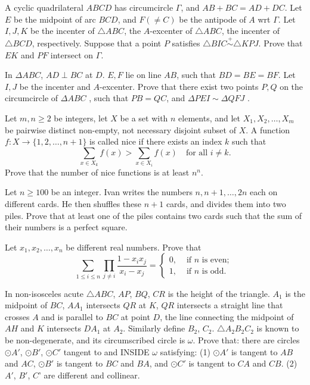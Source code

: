 \documentclass[11pt]{scrartcl}
\begin{document}
\begin{problem}[571352513856417722]
	A cyclic quadrilateral $ABCD$ has circumcircle $\Gamma$, and $AB+BC=AD+DC$. Let $E$ be the midpoint of arc $BCD$, and $F (\neq C)$ be the antipode of $A$ wrt $\Gamma$. Let $I,J,K$ be the incenter of $\triangle ABC$, the $A$-excenter of $\triangle ABC$, the incenter of $\triangle BCD$, respectively.
Suppose that a point $P$ satisfies $\triangle BIC \stackrel{+}{\sim} \triangle KPJ$. Prove that $EK$ and $PF$ intersect on $\Gamma.$
\end{problem}
\begin{problem}[8402748184217471405]
In $\Delta ABC$, $AD \perp BC$ at $D$. $E,F$ lie on line $AB$, such that $BD=BE=BF$. Let $I,J$ be the incenter and $A$-excenter. Prove that there exist two points $P,Q$ on the circumcircle of $\Delta ABC$ , such that $PB=QC$, and $\Delta PEI \sim \Delta QFJ$ .
\end{problem}
\begin{problem}[967014444176640]
Let $m,n \geqslant 2$ be integers, let $X$ be a set with $n$ elements, and let $X_1,X_2,\ldots,X_m$ be pairwise distinct non-empty, not necessary disjoint subset of $X$. A function $f \colon X \to \{1,2,\ldots,n+1\}$ is called nice if there exists an index $k$ such that\[\sum_{x \in X_k} f(x)>\sum_{x \in X_i} f(x) \quad \text{for all } i \ne k.\]Prove that the number of nice functions is at least $n^n$.
\end{problem}
\begin{problem}[258585206260584]
Let $n \geqslant 100$ be an integer. Ivan writes the numbers $n, n+1, \ldots, 2 n$ each on different cards. He then shuffles these $n+1$ cards, and divides them into two piles. Prove that at least one of the piles contains two cards such that the sum of their numbers is a perfect square.
\end{problem}
\begin{problem}[443006607452241]
Let $x_1, x_2, \dots, x_n$ be different real numbers. Prove that
\[\sum_{1 \leqslant i \leqslant n} \prod_{j \neq i} \frac{1-x_{i} x_{j}}{x_{i}-x_{j}}=\left\{\begin{array}{ll}
0, & \text { if } n \text { is even; } \\
1, & \text { if } n \text { is odd. }
\end{array}\right.\]
\end{problem}
\begin{problem}[1293772592063302344]
In non-isosceles acute ${}{\triangle ABC}$, $AP$, $BQ$, $CR$ is the height of the triangle. $A_1$ is the midpoint of $BC$, $AA_1$ intersects $QR$ at $K$, $QR$ intersects a straight line that crosses ${A}$ and is parallel to $BC$ at point ${D}$, the line connecting the midpoint of $AH$ and ${K}$ intersects $DA_1$ at $A_2$. Similarly define $B_2$, $C_2$. ${}\triangle A_2B_2C_2$ is known to be non-degenerate, and its circumscribed circle is $\omega$. Prove that: there are circles $\odot A'$, $\odot B'$, $\odot C'$ tangent to and INSIDE $\omega$ satisfying:
(1) $\odot A'$ is tangent to $AB$ and $AC$, $\odot B'$ is tangent to $BC$ and $BA$, and $\odot C'$ is tangent to $CA$ and $CB$.
(2) $A'$, $B'$, $C$' are different and collinear.
\end{problem}
\end{document}

